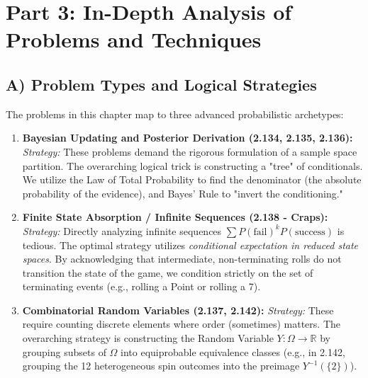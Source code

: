 \documentclass[11pt, letterpaper]{article}
\theoremstyle{definition}
\newcommand{\R}{\mathbb{R}}
\begin{document}
\newpage
\section{Part 3: In-Depth Analysis of Problems and Techniques}

\subsection{A) Problem Types and Logical Strategies}
The problems in this chapter map to three advanced probabilistic archetypes:
\begin{enumerate}
    \item \textbf{Bayesian Updating and Posterior Derivation (2.134, 2.135, 2.136):}
    \textit{Strategy:} These problems demand the rigorous formulation of a sample space partition. The overarching logical trick is constructing a "tree" of conditionals. We utilize the Law of Total Probability to find the denominator (the absolute probability of the evidence), and Bayes' Rule to "invert the conditioning."
    
    \item \textbf{Finite State Absorption / Infinite Sequences (2.138 - Craps):}
    \textit{Strategy:} Directly analyzing infinite sequences $\sum P(\text{fail})^k P(\text{success})$ is tedious. The optimal strategy utilizes \textit{conditional expectation in reduced state spaces}. By acknowledging that intermediate, non-terminating rolls do not transition the state of the game, we condition strictly on the set of terminating events (e.g., rolling a Point or rolling a 7).
    
    \item \textbf{Combinatorial Random Variables (2.137, 2.142):}
    \textit{Strategy:} These require counting discrete elements where order (sometimes) matters. The overarching strategy is constructing the Random Variable $Y: \Omega \to \R$ by grouping subsets of $\Omega$ into equiprobable equivalence classes (e.g., in 2.142, grouping the 12 heterogeneous spin outcomes into the preimage $Y^{-1}(\{2\})$).
\end{enumerate}
\end{document}
